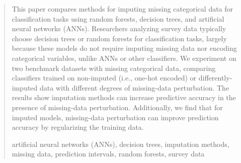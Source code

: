 \documentclass[10pt]{book}
\theoremstyle{definition}
\begin{document}
\begin{quotation}
This paper compares methods for imputing missing categorical data for classification tasks using random forests, decision trees, and artificial neural networks (ANNs). Researchers analyzing survey data typically choose decision trees or random forests for classification tasks, largely because these models do not require imputing missing data nor encoding categorical variables, unlike ANNs or other classifiers. We experiment on two benchmark datasets with missing categorical data, comparing classifiers trained on non-imputed (i.e., one-hot encoded) or differently-imputed data with different degrees of missing-data perturbation. The results show imputation methods can increase predictive accuracy in the presence of missing-data perturbation. Additionally, we find that for imputed models, missing-data perturbation can improve prediction accuracy by regularizing the training data. \par

\vspace{9pt}
artificial neural networks (ANNs), decision trees,  imputation methods, missing data,  prediction intervals, random forests, survey data
\par
\end{quotation}\par



\def\thefigure{\arabic{figure}}
\def\thetable{\arabic{table}}

\fontsize{12}{14pt plus.8pt minus .6pt}\selectfont

\newpage %

\setcounter{chapter}{1}
\setcounter{equation}{0} %
\setcounter{page}{1} %
\end{document}
